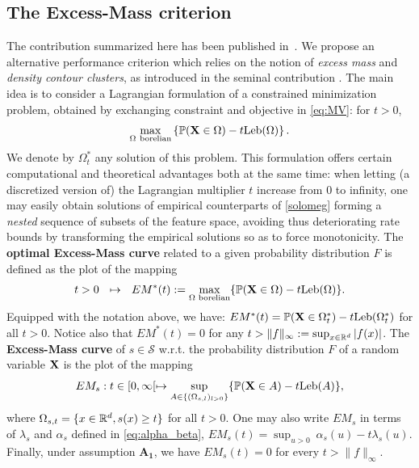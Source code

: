 \subsection{The Excess-Mass criterion}
\label{resume:em-curve}
The contribution summarized here has been published in~\cite{AISTAT15}.
We propose an alternative performance criterion which relies on the notion of \textit{excess mass} and \textit{density contour clusters}, as introduced in the seminal contribution \cite{Polonik95}. The main idea is to consider a Lagrangian formulation of a constrained minimization problem, obtained by exchanging constraint and objective in \eqref{eq:MV}: for $t>0$,
\begin{equation}
\label{solomeg}
\max_{\Omega~ \text{borelian}}  \left\{ \mathbb{P}(\mathbf X \in \Omega) - t \text{Leb}(\Omega) \right\}.
\end{equation}
We denote by $\Omega^*_t$ any solution of this problem. This formulation offers certain computational and theoretical advantages both at the same time: when letting (a discretized version of) the Lagrangian multiplier $t$ increase from $0$ to infinity, one may easily obtain solutions of empirical counterparts of \eqref{solomeg} forming a \textit{nested} sequence of subsets of the feature space, avoiding thus deteriorating rate bounds by transforming the empirical solutions so as to force monotonicity.
%
The \textbf{optimal Excess-Mass curve} related to a given probability distribution $F$ is defined as the plot of the mapping $$t>0~~\mapsto~~ EM^*(t):=\max_{\Omega\text{ borelian} } \{ {\mathbb{P}} (\mathbf X\in \Omega)-t\text{Leb}(\Omega) \}.$$ 
Equipped with the notation above, we have: $EM^*(t)=\mathbb{P}(\mathbf X \in \Omega_t^*)-t \text{Leb}(\Omega_t^*)$ for all $t>0$.
Notice also that $EM^*(t) = 0$ for any $t>\|f\|_\infty:=\sup_{x\in \mathbb{R}^d}\vert f(x)\vert$. 
%
The  \textbf{Excess-Mass curve} of $s\in\mathcal{S}$  w.r.t. the probability distribution $F$ of a random variable $\mathbf X$ is the plot of the mapping
\begin{equation}
\label{EM}
EM_s : t \in [0, \infty[ \mapsto \sup_{A \in \{(\Omega_{s,l})_{l>0}\}}\{ {\mathbb{P}}(\mathbf X \in A) - t \text{Leb}(A)\},
\end{equation}
where $\Omega_{s,t}=\{ x \in \mathbb{R}^d, s(x) \ge t \}$ for all $t>0$.
One may also write $EM_s$ in terms of $\lambda_s$ and $\alpha_s$ defined in \eqref{eq:alpha_beta}, $EM_s(t)= \sup_{u>0}~ \alpha_s(u) -t \lambda_s(u) $. Finally, under assumption $\mathbf{A_1}$, we have $EM_s(t)=0$ for every $t> \|f\|_\infty$. 
